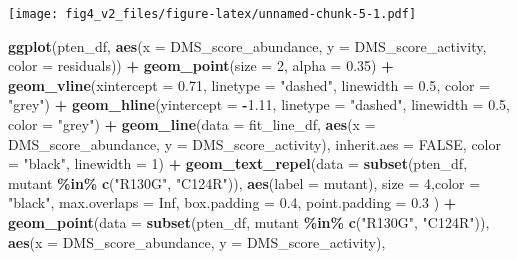 \documentclass[
]{article}
\newenvironment{Shaded}{\begin{snugshade}}{\end{snugshade}}
\newcommand{\AttributeTok}[1]{\textcolor[rgb]{0.13,0.29,0.53}{#1}}
\newcommand{\ConstantTok}[1]{\textcolor[rgb]{0.56,0.35,0.01}{#1}}
\newcommand{\DecValTok}[1]{\textcolor[rgb]{0.00,0.00,0.81}{#1}}
\newcommand{\FloatTok}[1]{\textcolor[rgb]{0.00,0.00,0.81}{#1}}
\newcommand{\FunctionTok}[1]{\textcolor[rgb]{0.13,0.29,0.53}{\textbf{#1}}}
\newcommand{\NormalTok}[1]{#1}
\newcommand{\SpecialCharTok}[1]{\textcolor[rgb]{0.81,0.36,0.00}{\textbf{#1}}}
\newcommand{\StringTok}[1]{\textcolor[rgb]{0.31,0.60,0.02}{#1}}
\begin{document}
\texttt{[image: fig4\_v2\_files/figure-latex/unnamed-chunk-5-1.pdf]}

\begin{Shaded}
\begin{Highlighting}[]
\FunctionTok{ggplot}\NormalTok{(pten\_df, }\FunctionTok{aes}\NormalTok{(}\AttributeTok{x =}\NormalTok{ DMS\_score\_abundance, }\AttributeTok{y =}\NormalTok{ DMS\_score\_activity, }\AttributeTok{color =}\NormalTok{ residuals)) }\SpecialCharTok{+}
  \FunctionTok{geom\_point}\NormalTok{(}\AttributeTok{size =} \DecValTok{2}\NormalTok{, }\AttributeTok{alpha =} \FloatTok{0.35}\NormalTok{) }\SpecialCharTok{+}
  \FunctionTok{geom\_vline}\NormalTok{(}\AttributeTok{xintercept =} \FloatTok{0.71}\NormalTok{, }\AttributeTok{linetype =} \StringTok{"dashed"}\NormalTok{, }\AttributeTok{linewidth =} \FloatTok{0.5}\NormalTok{, }\AttributeTok{color =} \StringTok{"grey"}\NormalTok{) }\SpecialCharTok{+}
  \FunctionTok{geom\_hline}\NormalTok{(}\AttributeTok{yintercept =} \SpecialCharTok{{-}}\FloatTok{1.11}\NormalTok{, }\AttributeTok{linetype =} \StringTok{"dashed"}\NormalTok{, }\AttributeTok{linewidth =} \FloatTok{0.5}\NormalTok{, }\AttributeTok{color =} \StringTok{"grey"}\NormalTok{) }\SpecialCharTok{+}
  \FunctionTok{geom\_line}\NormalTok{(}\AttributeTok{data =}\NormalTok{ fit\_line\_df, }\FunctionTok{aes}\NormalTok{(}\AttributeTok{x =}\NormalTok{ DMS\_score\_abundance, }\AttributeTok{y =}\NormalTok{ DMS\_score\_activity),}
            \AttributeTok{inherit.aes =} \ConstantTok{FALSE}\NormalTok{, }\AttributeTok{color =} \StringTok{"black"}\NormalTok{, }\AttributeTok{linewidth =} \DecValTok{1}\NormalTok{) }\SpecialCharTok{+}
    \FunctionTok{geom\_text\_repel}\NormalTok{(}\AttributeTok{data =} \FunctionTok{subset}\NormalTok{(pten\_df, mutant }\SpecialCharTok{\%in\%} \FunctionTok{c}\NormalTok{(}\StringTok{"R130G"}\NormalTok{, }\StringTok{"C124R"}\NormalTok{)),}
                  \FunctionTok{aes}\NormalTok{(}\AttributeTok{label =}\NormalTok{ mutant),}
                  \AttributeTok{size =} \DecValTok{4}\NormalTok{,}\AttributeTok{color =} \StringTok{"black"}\NormalTok{,}
                  \AttributeTok{max.overlaps =} \ConstantTok{Inf}\NormalTok{, }\AttributeTok{box.padding =} \FloatTok{0.4}\NormalTok{, }\AttributeTok{point.padding =} \FloatTok{0.3}
\NormalTok{  ) }\SpecialCharTok{+}
  \FunctionTok{geom\_point}\NormalTok{(}\AttributeTok{data =} \FunctionTok{subset}\NormalTok{(pten\_df, mutant }\SpecialCharTok{\%in\%} \FunctionTok{c}\NormalTok{(}\StringTok{"R130G"}\NormalTok{, }\StringTok{"C124R"}\NormalTok{)),}
             \FunctionTok{aes}\NormalTok{(}\AttributeTok{x =}\NormalTok{ DMS\_score\_abundance, }\AttributeTok{y =}\NormalTok{ DMS\_score\_activity),}

\end{Highlighting}
\end{Shaded}
\end{document}
